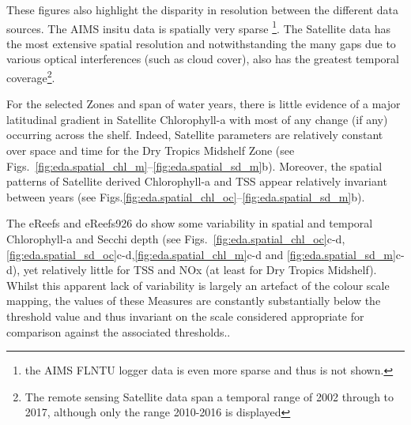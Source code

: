 

These figures also highlight the disparity in resolution
between the different data sources. The AIMS insitu data is spatially very sparse \footnote{the AIMS
FLNTU logger data is even more sparse and thus is not shown.}.  The Satellite data has the most
extensive spatial resolution and notwithstanding the many gaps due to various optical interferences
(such as cloud cover), also has the greatest temporal coverage\footnote{The remote sensing Satellite data
span a temporal range of 2002 through to 2017, although only the range 2010-2016 is displayed}.

For the selected Zones and span of water years, there is little evidence of a major latitudinal
gradient in Satellite Chlorophyll-a with most of any change (if any) occurring across the shelf.
Indeed, Satellite parameters are relatively constant over space and time for the Dry Tropics
Midshelf Zone (see Figs.~\ref{fig:eda.spatial_chl_m}--\ref{fig:eda.spatial_sd_m}b).  Moreover, the
spatial patterns of Satellite derived Chlorophyll-a and TSS appear relatively invariant between
years (see Figs.\ref{fig:eda.spatial_chl_oc}--\ref{fig:eda.spatial_sd_m}b).

The eReefs and eReefs926 do show some variability in spatial and temporal Chlorophyll-a and Secchi
depth (see
Figs.~\ref{fig:eda.spatial_chl_oc}c-d,\ref{fig:eda.spatial_sd_oc}c-d,\ref{fig:eda.spatial_chl_m}c-d
and \ref{fig:eda.spatial_sd_m}c-d), yet relatively little for TSS and NOx (at least for Dry Tropics
Midshelf).  Whilst this apparent lack of variability is largely an artefact of the colour scale mapping,
the values of these Measures are constantly
substantially below the threshold value and thus invariant on the scale considered
appropriate for comparison against the associated thresholds..



